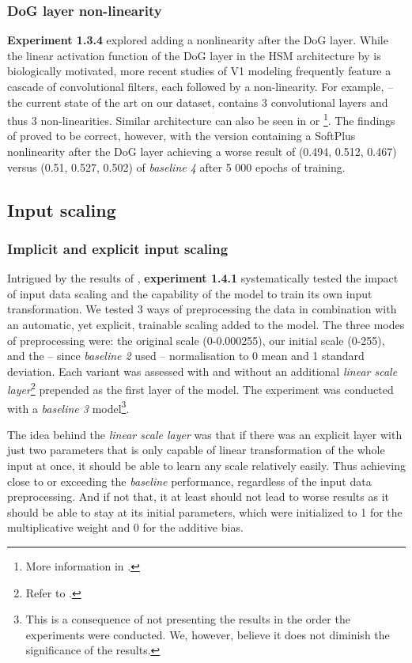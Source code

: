 \subsubsection{DoG layer non-linearity}\label{ex:1.3.4}

\textbf{Experiment 1.3.4} explored adding a nonlinearity after the DoG layer. While the linear activation function of the DoG layer in the HSM architecture by \cite{antolik} is biologically motivated, more recent studies of V1 modeling frequently feature a cascade of convolutional filters, each followed by a non-linearity. For example, \cite{klindt} -- the current state of the art on our dataset, contains 3 convolutional layers and thus 3 non-linearities. Similar architecture can also be seen in \cite{ecker} or \cite{Walke506956}\footnote{More information in .}. The findings of \citeauthor{antolik} proved to be correct, however, with the version containing a SoftPlus nonlinearity after the DoG layer achieving a worse result of (0.494, 0.512, 0.467) versus (0.51, 0.527, 0.502) of \textit{baseline 4} after 5 000 epochs of training.

\subsection{Input scaling}
\subsubsection{Implicit and explicit input scaling}

Intrigued by the results of , \textbf{experiment 1.4.1} systematically tested the impact of input data scaling and the capability of the model to train its own input transformation. We tested 3 ways of preprocessing the data in combination with an automatic, yet explicit, trainable scaling added to the model. The three modes of preprocessing were: the original scale (0-0.000255), our initial scale (0-255), and the -- since \textit{baseline 2} used -- normalisation to 0 mean and 1 standard deviation. Each variant was assessed with and without an additional \textit{linear scale layer}\footnote{Refer to .} prepended as the first layer of the model. The experiment was conducted with a \textit{baseline 3} model\footnote{This is a consequence of not presenting the results in the order the experiments were conducted. We, however, believe it does not diminish the significance of the results.}.

The idea behind the \textit{linear scale layer} was that if there was an explicit layer with just two parameters that is only capable of linear transformation of the whole input at once, it should be able to learn any scale relatively easily. Thus achieving close to or exceeding the \textit{baseline} performance, regardless of the input data preprocessing. And if not that, it at least should not lead to worse results as it should be able to stay at its initial parameters, which were initialized to 1 for the multiplicative weight and 0 for the additive bias.

